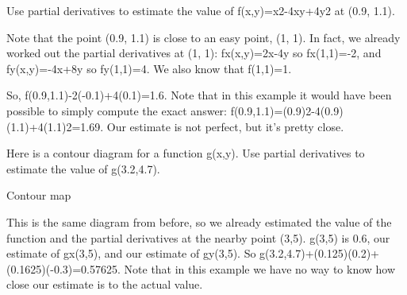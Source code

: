 \begin{example}
Use partial derivatives to estimate the value of f(x,y)=x2-4xy+4y2 at (0.9, 1.1).

\begin{solution}
  Note that the point (0.9, 1.1) is close to an easy point, (1, 1). In fact, we already worked out the partial derivatives at (1, 1): fx(x,y)=2x-4y so fx(1,1)=-2, and fy(x,y)=-4x+8y so fy(1,1)=4. We also know that f(1,1)=1.

So,
f(0.9,1.1)-2(-0.1)+4(0.1)=1.6.
Note that in this example it would have been possible to simply compute the exact answer:
f(0.9,1.1)=(0.9)2-4(0.9)(1.1)+4(1.1)2=1.69.
Our estimate is not perfect, but it's pretty close.
\end{solution}\end{example}

\begin{example}
Here is a contour diagram for a function g(x,y). Use partial derivatives to estimate the value of g(3.2,4.7).

Contour map
\begin{solution}
  This is the same diagram from before, so we already estimated the value of the function and the partial derivatives at the nearby point (3,5). g(3,5) is 0.6, our estimate of gx(3,5), and our estimate of gy(3,5). So
g(3.2,4.7)+(0.125)(0.2)+(0.1625)(-0.3)=0.57625.
Note that in this example we have no way to know how close our estimate is to the actual value.
\end{solution}\end{example}

